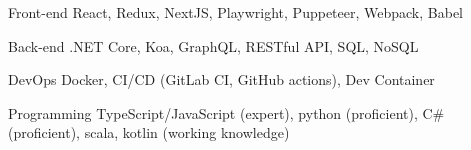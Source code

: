 

\begin{cvskills}

  \cvskill
  {Front-end}
  {React, Redux, NextJS, Playwright, Puppeteer, Webpack, Babel}

  \cvskill
  {Back-end}
  {.NET Core, Koa, GraphQL, RESTful API, SQL, NoSQL}

  \cvskill
  {DevOps}
  {Docker, CI/CD (GitLab CI, GitHub actions), Dev Container}

  \cvskill
  {Programming}
  {TypeScript/JavaScript (expert), python (proficient), C\# (proficient), scala, kotlin (working knowledge)}


\end{cvskills}
